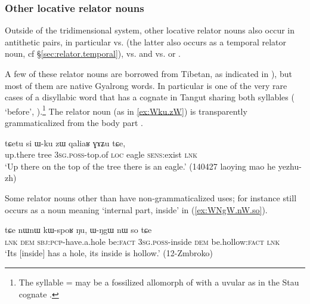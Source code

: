 \subsubsection{Other locative relator nouns} \label{sec:other.locative.relator}
Outside of the tridimensional system, other locative relator nouns also occur in antithetic pairs, in particular   vs.   (the latter also occurs as a temporal relator noun, cf §\ref{sec:relator.temporal}),  vs.   and    vs.  or .

A few of these relator nouns are borrowed from Tibetan, as indicated in ), but most of them are native Gyalrong words. In particular  is one of the very rare cases of a disyllabic word that has a cognate in Tangut sharing both syllables ( `before', \citealt{lai20tangut}).\footnote{The syllable  =  may be a fossilized allomorph of  with a uvular as in the Stau cognate .} The relator noun  (as in \ref{ex:Wku.zW}) is transparently grammaticalized from the body part .

\begin{exe}
\ex \label{ex:Wku.zW}
 \gll tɕetu si ɯ-ku zɯ qaliaʁ ɣɤʑu tɕe, \\
 up.there tree \textsc{3sg}.\textsc{poss}-top.of \textsc{loc} eagle \textsc{sens}:exist \textsc{lnk} \\
 \glt `Up there on the top of the tree there is an eagle.' (140427 laoying mao he yezhu-zh)
\end{exe}

Some relator nouns other than  have non-grammaticalized uses; for instance  still occurs as a noun meaning  `internal part, inside' in (\ref{ex:WNgW.nW.so}).

\begin{exe}
\ex \label{ex:WNgW.nW.so}
 \gll tɕe nɯnɯ kɯ-spoʁ ŋu, ɯ-ŋgɯ nɯ so tɕe  \\
 \textsc{lnk} \textsc{dem} \textsc{sbj}:\textsc{pcp}-have.a.hole be:\textsc{fact} \textsc{3sg}.\textsc{poss}-inside \textsc{dem} be.hollow:\textsc{fact} \textsc{lnk} \\
 \glt `Its [inside] has a hole, its inside is hollow.' (12-Zmbroko)
\end{exe}

